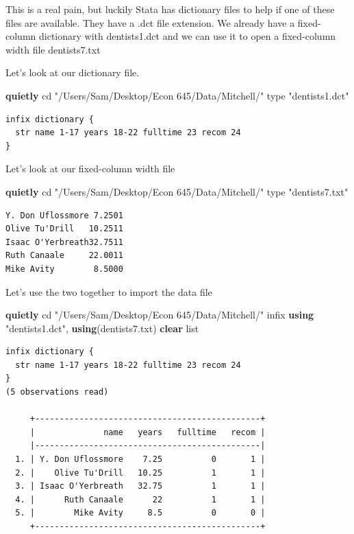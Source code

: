 \documentclass[
]{book}
\newenvironment{Shaded}{\begin{snugshade}}{\end{snugshade}}
\newcommand{\DecValTok}[1]{\textcolor[rgb]{0.00,0.00,0.81}{#1}}
\newcommand{\KeywordTok}[1]{\textcolor[rgb]{0.13,0.29,0.53}{\textbf{#1}}}
\newcommand{\NormalTok}[1]{#1}
\newcommand{\OtherTok}[1]{\textcolor[rgb]{0.56,0.35,0.01}{#1}}
\newcommand{\StringTok}[1]{\textcolor[rgb]{0.31,0.60,0.02}{#1}}
\begin{document}
This is a real pain, but luckily Stata has dictionary files to help if one of these files are available. They have a .dct file extension. We already have a fixed-column dictionary with dentists1.dct and we can use it to open a fixed-column width file dentists7.txt

Let's look at our dictionary file.

\begin{Shaded}
\begin{Highlighting}[]
\KeywordTok{quietly}\NormalTok{ cd }\StringTok{"/Users/Sam/Desktop/Econ 645/Data/Mitchell/"}
\DecValTok{type} \StringTok{"dentists1.dct"}
\end{Highlighting}
\end{Shaded}

\begin{verbatim}
infix dictionary {
  str name 1-17 years 18-22 fulltime 23 recom 24
}
\end{verbatim}

Let's look at our fixed-column width file

\begin{Shaded}
\begin{Highlighting}[]
\KeywordTok{quietly}\NormalTok{ cd }\StringTok{"/Users/Sam/Desktop/Econ 645/Data/Mitchell/"}
\DecValTok{type} \StringTok{"dentists7.txt"}
\end{Highlighting}
\end{Shaded}

\begin{verbatim}
Y. Don Uflossmore 7.2501
Olive Tu'Drill   10.2511
Isaac O'Yerbreath32.7511
Ruth Canaale     22.0011
Mike Avity        8.5000
\end{verbatim}

Let's use the two together to import the data file

\begin{Shaded}
\begin{Highlighting}[]
\KeywordTok{quietly}\NormalTok{ cd }\StringTok{"/Users/Sam/Desktop/Econ 645/Data/Mitchell/"}
\NormalTok{infix }\KeywordTok{using} \StringTok{"dentists1.dct"}\NormalTok{, }\KeywordTok{using}\NormalTok{(dentists7.txt) }\KeywordTok{clear}
\OtherTok{list}
\end{Highlighting}
\end{Shaded}

\begin{verbatim}
infix dictionary {
  str name 1-17 years 18-22 fulltime 23 recom 24
}
(5 observations read)

     +----------------------------------------------+
     |              name   years   fulltime   recom |
     |----------------------------------------------|
  1. | Y. Don Uflossmore    7.25          0       1 |
  2. |    Olive Tu'Drill   10.25          1       1 |
  3. | Isaac O'Yerbreath   32.75          1       1 |
  4. |      Ruth Canaale      22          1       1 |
  5. |        Mike Avity     8.5          0       0 |
     +----------------------------------------------+
\end{verbatim}
\end{document}
